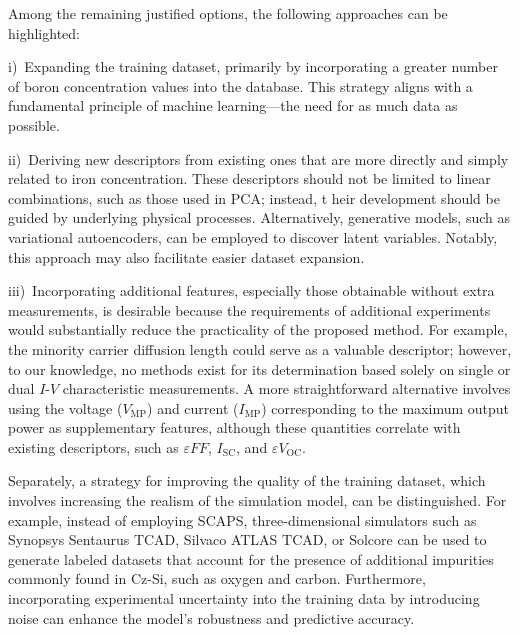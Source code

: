 \documentclass[a4paper,fleqn]{cas-sc}
\begin{document}
Among the remaining justified options, the following approaches can be highlighted:

\noindent
i)~Expanding the training dataset, primarily by incorporating a greater number of boron concentration values into the database.
This strategy aligns with a fundamental principle of machine learning—the need for as much data as possible.

\noindent
ii)~Deriving new descriptors from existing ones that are more directly and simply related to iron concentration.
These descriptors should not be limited to linear combinations, such as those used in PCA; instead, t
heir development should be guided by underlying physical processes.
Alternatively, generative models, such as variational autoencoders,
can be employed to discover latent variables.
Notably, this approach may also facilitate easier dataset expansion.

\noindent
iii)~Incorporating additional features, especially those obtainable without extra measurements,
is desirable because the requirements of additional experiments would substantially reduce
the practicality of the proposed method.
For example, the minority carrier diffusion length could serve as a valuable descriptor;
however, to our knowledge, no methods exist for its determination based solely
on single or dual $I$-$V$ characteristic measurements.
A more straightforward alternative involves using the voltage ($V_\mathrm{MP}$) and current ($I_\mathrm{MP}$)
corresponding to the maximum output power as supplementary features,
although these quantities correlate with existing descriptors, such as $\varepsilon F\!F$, $I_\mathrm{SC}$,
and $\varepsilon V_\mathrm{OC}$.

Separately, a strategy for improving the quality of the training dataset,
which involves increasing the realism of the simulation model, can be distinguished.
For example, instead of employing SCAPS, three-dimensional simulators such as Synopsys Sentaurus TCAD,
Silvaco ATLAS TCAD, or Solcore can be used to generate labeled datasets
that account for the presence of additional impurities commonly found in Cz-Si,
such as oxygen and carbon.
Furthermore, incorporating experimental uncertainty into the training data by introducing noise
can enhance the model’s robustness and predictive accuracy.
\end{document}

